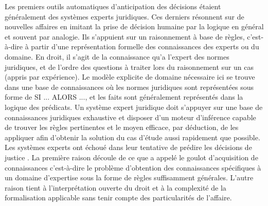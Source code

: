 Les premiers outils automatiques d'anticipation des décisions étaient généralement des systèmes experts juridiques. Ces derniers résonnent  sur de nouvelles affaires en imitant la prise de décision humaine par la logique en général et souvent par analogie. Ils s'appuient sur un raisonnement à base de règles, c'est-à-dire à partir d'une représentation formelle des connaissances des experts ou du domaine. En droit, il s'agit de la connaissance qu'a l'expert des normes juridiques, et de l'ordre des questions à traiter lors du raisonnement sur un cas (appris par expérience). Le modèle explicite de domaine nécessaire ici se trouve dans une base de connaissances où les normes juridiques sont représentées sous forme de \og SI ... ALORS ...\fg{}, et les faits sont généralement représentés dans la logique des prédicats. Un système expert juridique doit s’appuyer sur une base de connaissances juridiques exhaustive et disposer d’un moteur d’inférence capable de trouver les règles pertinentes et le moyen efficace, par déduction, de les appliquer afin d’obtenir la solution du cas d'étude aussi rapidement que possible. Les systèmes experts ont échoué dans leur tentative de prédire les décisions de justice \citep{leith2010risefall}. La première raison découle de ce que \citet{Berka2011rbr-cbr} a appelé le \og goulot d'acquisition de connaissances \fg{} c'est-à-dire le problème d'obtention des connaissances spécifiques à un domaine d’expertise sous la forme de règles suffisamment générales. L'autre raison tient à l'interprétation ouverte du droit et à la complexité de la formalisation applicable sans tenir compte des particularités de l'affaire. 

